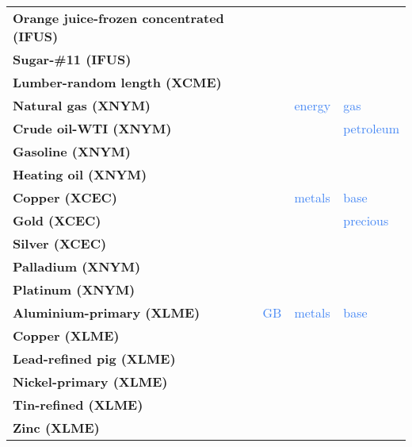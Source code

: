\documentclass[
  authoryear,
  preprint,
  3p]{elsarticle}
\begin{document}
\begin{longtable}[t]{>{}l>{}l>{}l>{}l}
\textbf{Orange juice-frozen concentrated (IFUS)} & \textcolor[HTML]{4285f4}{} & \textcolor[HTML]{4285f4}{} & \textcolor[HTML]{4285f4}{}\\
\textbf{Sugar-\#11 (IFUS)} & \textcolor[HTML]{4285f4}{} & \textcolor[HTML]{4285f4}{} & \textcolor[HTML]{4285f4}{}\\
\textbf{Lumber-random length (XCME)} & \textcolor[HTML]{4285f4}{} & \textcolor[HTML]{4285f4}{} & \textcolor[HTML]{4285f4}{}\\
\addlinespace
\textbf{Natural gas (XNYM)} & \textcolor[HTML]{4285f4}{} & \textcolor[HTML]{4285f4}{energy} & \textcolor[HTML]{4285f4}{gas}\\
\textbf{Crude oil-WTI (XNYM)} & \textcolor[HTML]{4285f4}{} & \textcolor[HTML]{4285f4}{} & \textcolor[HTML]{4285f4}{petroleum}\\
\textbf{Gasoline (XNYM)} & \textcolor[HTML]{4285f4}{} & \textcolor[HTML]{4285f4}{} & \textcolor[HTML]{4285f4}{}\\
\textbf{Heating oil (XNYM)} & \textcolor[HTML]{4285f4}{} & \textcolor[HTML]{4285f4}{} & \textcolor[HTML]{4285f4}{}\\
\textbf{Copper (XCEC)} & \textcolor[HTML]{4285f4}{} & \textcolor[HTML]{4285f4}{metals} & \textcolor[HTML]{4285f4}{base}\\
\addlinespace
\textbf{Gold (XCEC)} & \textcolor[HTML]{4285f4}{} & \textcolor[HTML]{4285f4}{} & \textcolor[HTML]{4285f4}{precious}\\
\textbf{Silver (XCEC)} & \textcolor[HTML]{4285f4}{} & \textcolor[HTML]{4285f4}{} & \textcolor[HTML]{4285f4}{}\\
\textbf{Palladium (XNYM)} & \textcolor[HTML]{4285f4}{} & \textcolor[HTML]{4285f4}{} & \textcolor[HTML]{4285f4}{}\\
\textbf{Platinum (XNYM)} & \textcolor[HTML]{4285f4}{} & \textcolor[HTML]{4285f4}{} & \textcolor[HTML]{4285f4}{}\\
\textbf{Aluminium-primary (XLME)} & \textcolor[HTML]{4285f4}{GB} & \textcolor[HTML]{4285f4}{metals} & \textcolor[HTML]{4285f4}{base}\\
\addlinespace
\textbf{Copper (XLME)} & \textcolor[HTML]{4285f4}{} & \textcolor[HTML]{4285f4}{} & \textcolor[HTML]{4285f4}{}\\
\textbf{Lead-refined pig (XLME)} & \textcolor[HTML]{4285f4}{} & \textcolor[HTML]{4285f4}{} & \textcolor[HTML]{4285f4}{}\\
\textbf{Nickel-primary (XLME)} & \textcolor[HTML]{4285f4}{} & \textcolor[HTML]{4285f4}{} & \textcolor[HTML]{4285f4}{}\\
\textbf{Tin-refined (XLME)} & \textcolor[HTML]{4285f4}{} & \textcolor[HTML]{4285f4}{} & \textcolor[HTML]{4285f4}{}\\
\textbf{Zinc (XLME)} & \textcolor[HTML]{4285f4}{} & \textcolor[HTML]{4285f4}{} & \textcolor[HTML]{4285f4}{}\\
\bottomrule

\end{longtable}

\endgroup{}

\newpage


\renewcommand\refname{References}
  
\end{document}
